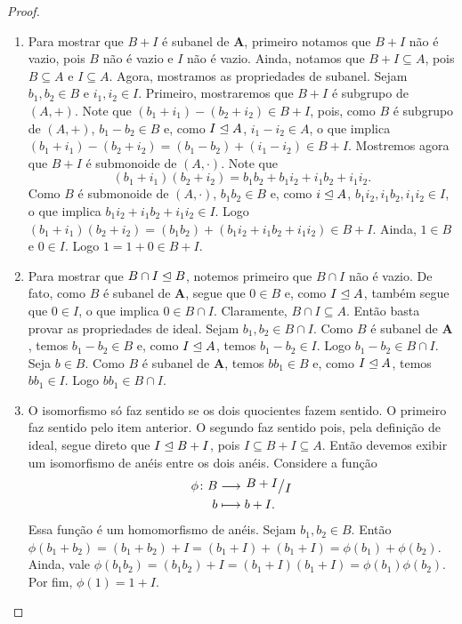 \begin{proof}
	\begin{enumerate}
	\item Para mostrar que $B+I$ é subanel de $\bm A$, primeiro notamos que $B+I$ não é vazio, pois $B$ não é vazio e $I$ não é vazio. Ainda, notamos que $B+I \subseteq A$, pois $B \subseteq A$ e $I \subseteq A$. Agora, mostramos as propriedades de subanel. Sejam $b_1,b_2 \in B$ e $i_1,i_2 \in I$. Primeiro, mostraremos que $B+I$ é subgrupo de $(A,+)$. Note que $(b_1+i_1)-(b_2+i_2) \in B+I$, pois, como $B$ é subgrupo de $(A,+)$, $b_1-b_2 \in B$ e, como $I \mathrel{\unlhd} A$, $i_1-i_2 \in A$, o que implica $(b_1+i_1)-(b_2+i_2) = (b_1-b_2)+(i_1-i_2) \in B+I$. Mostremos agora que $B+I$ é submonoide de $(A,\cdot)$. Note que
	\begin{equation*}
	(b_1+i_1)(b_2+i_2)=b_1b_2+b_1i_2+i_1b_2+i_1i_2.
	\end{equation*}
Como $B$ é submonoide de $(A,\cdot)$, $b_1b_2 \in B$ e, como $i \mathrel{\unlhd} A$, $b_1i_2,i_1b_2,i_1i_2 \in I$, o que implica $b_1i_2+i_1b_2+i_1i_2 \in I$. Logo $(b_1+i_1)(b_2+i_2)=(b_1b_2)+(b_1i_2+i_1b_2+i_1i_2) \in B+I$. Ainda, $1 \in B$ e $0 \in I$. Logo $1=1+0 \in B+I$.
	\item Para mostrar que $B \cap I \mathrel{\unlhd} B$, notemos primeiro que $B \cap I$ não é vazio. De fato, como $B$ é subanel de $\bm A$, segue que $0 \in B$ e, como $I \mathrel{\unlhd} A$, também segue que $0 \in I$, o que implica $0 \in B \cap I$. Claramente, $B \cap I \subseteq A$. Então basta provar as propriedades de ideal. Sejam $b_1,b_2 \in B \cap I$. Como $B$ é subanel de $\bm A$, temos $b_1-b_2 \in B$ e, como $I \mathrel{\unlhd} A$, temos $b_1-b_2 \in I$. Logo $b_1-b_2 \in B \cap I$. Seja $b \in B$. Como $B$ é subanel de $\bm A$, temos $bb_1 \in B$ e, como $I \mathrel{\unlhd} A$, temos $bb_1 \in I$. Logo $bb_1 \in B \cap I$.
	\item O isomorfismo só faz sentido se os dois quocientes fazem sentido. O primeiro faz sentido pelo item anterior. O segundo faz sentido pois, pela definição de ideal, segue direto que $I \mathrel{\unlhd} B+I$, pois $I \subseteq B+I \subseteq A$.
	Então devemos exibir um isomorfismo de anéis entre os dois anéis. Considere a função
	\begin{align*}
	\func{\phi}{B}{\quo{B+I}{I}}{b}{b+I.}
	\end{align*}
Essa função é um homomorfismo de anéis. Sejam $b_1,b_2 \in B$. Então $\phi(b_1+b_2)=(b_1+b_2)+I=(b_1+I)+(b_1+I)=\phi(b_1)+\phi(b_2)$. Ainda, vale $\phi(b_1b_2)=(b_1b_2)+I=(b_1+I)(b_1+I)=\phi(b_1)\phi(b_2)$. Por fim, $\phi(1)=1+I$.


\end{enumerate}
\end{proof}

